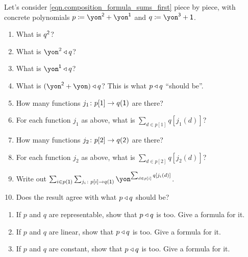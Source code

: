 \documentclass[Book-Poly]{subfiles}
\begin{document}
\begin{exercise}
Let's consider \eqref{eqn.composition_formula_sums_first} piece by piece, with concrete polynomials $p\coloneqq\yon^\2+\yon^\1$ and $q\coloneqq \yon^\3+\1$.
\begin{enumerate}
	\item What is $q^{\textsf{2}}$?
	\item What is $\yon^2\tri q$? 
	\item What is $\yon^\1\tri q$?
	\item What is $(\yon^\2+\yon)\tri q$? This is what $p\mathbin{\triangleleft} q$ ``should be''.
	\item How many functions $j_1\colon p[1]\to q(\textsf{1})$ are there?
	\item For each function $j_1$ as above, what is $\sum_{d\in p[1]} q[j_1(d)]$?
	\item How many functions $j_2\colon p[2]\to q(\textsf{2})$ are there?
	\item For each function $j_2$ as above, what is $\sum_{d\in p[2]} q[j_2(d)]$?
	\item Write out $\sum_{i\in p(\1)}\sum_{j_i\colon p[i]\to q(\1)}\yon^{\sum_{d\in p[i]}q[j_i(d)]}$.
	\item Does the result agree with what $p\mathbin{\triangleleft} q$ should be?
\qedhere
\end{enumerate}
\end{exercise}

\begin{exercise}\label{exc.composites_of_specials}
\begin{enumerate}
	\item If $p$ and $q$ are representable, show that $p\mathbin{\triangleleft} q$ is too. Give a formula for it.
	\item If $p$ and $q$ are linear, show that $p\mathbin{\triangleleft} q$ is too. Give a formula for it.
	\item If $p$ and $q$ are constant, show that $p\mathbin{\triangleleft} q$ is too. Give a formula for it.
\qedhere
\end{enumerate}
\end{exercise}
\end{document}
